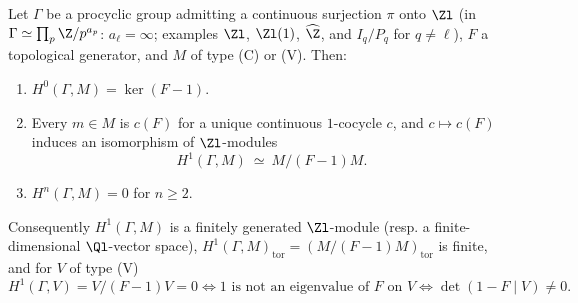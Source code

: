 \begin{theorem}\label{thm:cohomology:procyclic-compact}
Let $\Gamma$ be a procyclic group admitting a continuous surjection $\pi$ onto $\Zl$ (in $\Gamma\simeq\prod_p\Z/p^{a_p}$: $a_\ell=\infty$; examples $\Zl$, $\Zl(1)$, $\widehat\Z$,
and $I_q/P_q$ for $q\ne\ell$), $F$ a topological generator, and $M$ of type (C) or (V). Then:
\begin{enumerate}[label=(\roman*)]
\item $H^0(\Gamma,M)=\ker(F-1)$.
\item Every $m\in M$ is $c(F)$ for a unique continuous $1$-cocycle $c$, and $c\mapsto c(F)$ induces an isomorphism of $\Zl$-modules
\[
H^1(\Gamma,M)\ \simeq\ M/(F-1)M .
\]
\item $H^n(\Gamma,M)=0$ for $n\ge2$.
\end{enumerate}
Consequently $H^1(\Gamma,M)$ is a finitely generated $\Zl$-module (resp. a finite-dimensional $\Ql$-vector space), $H^1(\Gamma,M)_{\mathrm{tor}}=(M/(F-1)M)_{\mathrm{tor}}$ is
finite, and for $V$ of type (V)
\[
H^1(\Gamma,V)=V/(F-1)V=0\iff1\text{ is not an eigenvalue of }F\text{ on }V\iff\det(1-F\mid V)\ne0 .
\]
\end{theorem}

